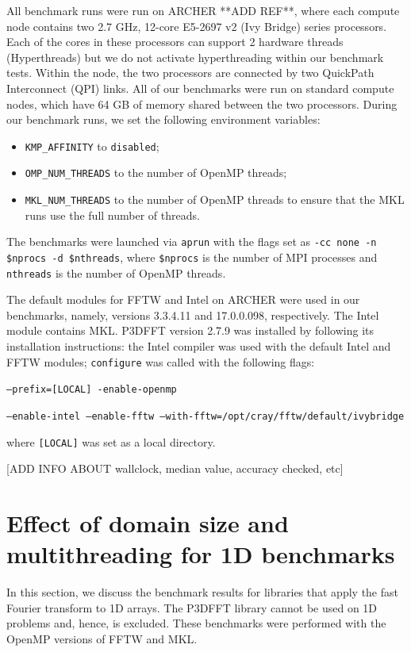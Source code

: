 \documentclass[a4paper]{article}
\begin{document}
All benchmark runs were run on ARCHER **ADD REF**, where each compute
node contains two 2.7 GHz, 12-core E5-2697 v2 (Ivy Bridge) series
processors. Each of the cores in these processors can support 2
hardware threads (Hyperthreads) but we do not activate hyperthreading
within our benchmark tests. Within the node, the two processors are
connected by two QuickPath Interconnect (QPI) links. All of our
benchmarks were run on standard compute nodes, which have 64 GB of
memory shared between the two processors. During our benchmark runs,
we set the following environment variables:
\begin{itemize}
\item \texttt{KMP\_AFFINITY} to \texttt{disabled};
\item \texttt{OMP\_NUM\_THREADS} to the number of OpenMP threads;
\item \texttt{MKL\_NUM\_THREADS} to the number of OpenMP threads to
  ensure that the MKL runs use the full number of threads.
\end{itemize}
The benchmarks were launched via \texttt{aprun} with the flags set as
\texttt{-cc none -n \$nprocs -d \$nthreads}, where \texttt{\$nprocs}
is the number of MPI processes and \texttt{nthreads} is the number of
OpenMP threads.

The default modules for FFTW and Intel on ARCHER were used in our
benchmarks, namely, versions 3.3.4.11 and 17.0.0.098,
respectively. The Intel module contains MKL.  P3DFFT version 2.7.9 was
installed by following its installation instructions: the Intel
compiler was used with the default Intel and FFTW modules;
\texttt{configure} was called with the following flags:

\noindent \texttt{--prefix=[LOCAL] -enable-openmp}

\noindent \texttt{--enable-intel --enable-fftw
  --with-fftw=/opt/cray/fftw/default/ivybridge}

\noindent where \texttt{[LOCAL]} was set as a local directory.

[ADD INFO ABOUT wallclock, median value, accuracy checked, etc]

\section{Effect of domain size and multithreading for 1D benchmarks}\label{Sec:1DMulti}

In this section, we discuss the benchmark results for libraries that
apply the fast Fourier transform to 1D arrays.  The P3DFFT library
cannot be used on 1D problems and, hence, is excluded. These
benchmarks were performed with the OpenMP versions of FFTW and MKL.
\end{document}
